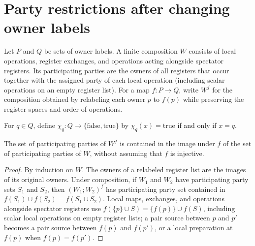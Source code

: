 \section{Party restrictions after changing owner labels}

Let $P$ and $Q$ be sets of owner labels. A finite composition $W$ consists of
local operations, register exchanges, and operations acting alongside spectator
registers. Its participating parties are the owners of all registers that occur
together with the assigned party of each local operation (including scalar
operations on an empty register list). For a map $f:P\to Q$, write $W^f$ for
the composition obtained by relabeling each owner $p$ to $f(p)$ while
preserving the register spaces and order of operations.

\begin{definition}
    \label{def:peps_single_party_selector}
    \leanok
    For $q\in Q$, define $\chi_q:Q\to\{\mathrm{false},\mathrm{true}\}$
    by $\chi_q(x)=\mathrm{true}$ if and only if $x=q$.
\end{definition}

\begin{lemma}
    \label{thm:peps_source_free_owner_parties}
    \leanok
    The set of participating parties of $W^f$ is contained in the image under
    $f$ of the set of participating parties of $W$, without assuming that $f$
    is injective.
\end{lemma}

\begin{proof}\leanok
    By induction on $W$. The owners of a relabeled register list
    are the images of its original owners. Under composition, if $W_1$ and
    $W_2$ have participating party sets $S_1$ and $S_2$, then $(W_1;W_2)^f$ has
    participating party set contained in $f(S_1)\cup f(S_2)=f(S_1\cup S_2)$.
    Local maps, exchanges, and operations alongside spectator registers use
    $f(\{p\}\cup S)=\{f(p)\}\cup f(S)$, including scalar local operations on
    empty register lists; a pair source between $p$ and $p'$ becomes a pair
    source between $f(p)$ and $f(p')$, or a local preparation at $f(p)$ when
    $f(p)=f(p')$.
\end{proof}

